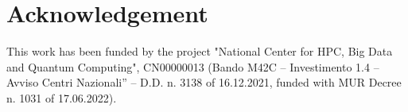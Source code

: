 \documentclass[letterpaper]{article}
\begin{document}
\section*{Acknowledgement}
This work has been funded by the project "National Center for HPC, Big Data and Quantum Computing", CN00000013 (Bando M42C – Investimento 1.4 – Avviso Centri Nazionali” – D.D. n. 3138 of 16.12.2021, funded with MUR Decree n. 1031 of 17.06.2022).


\end{document}
